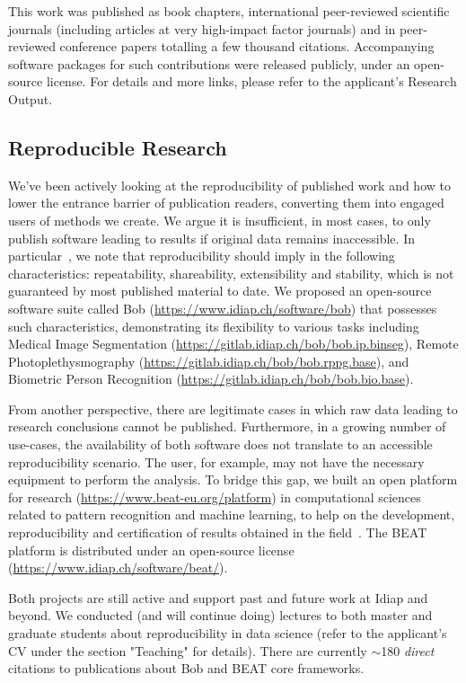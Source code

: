\documentclass[11pt,a4paper,sans]{moderncv}
\begin{document}
This work was published as book chapters, international peer-reviewed
scientific journals (including articles at very high-impact factor journals)
and in peer-reviewed conference papers totalling a few thousand citations.
Accompanying software packages for such contributions were released publicly,
under an open-source license. For details and more links, please refer to the
applicant's Research Output.

\subsection{Reproducible Research}

We've been actively looking at the reproducibility of published work and how to
lower the entrance barrier of publication readers, converting them into engaged
users of methods we create.  We argue it is insufficient, in most cases, to
only publish software leading to results if original data remains inaccessible.
In particular~\cite{acmmm-2012}, we note that reproducibility should imply
in the following characteristics: repeatability, shareability, extensibility
and stability, which is not guaranteed by most published material to date.  We
proposed an open-source software suite called Bob
(\url{https://www.idiap.ch/software/bob}) that possesses such characteristics,
demonstrating its flexibility to various tasks including Medical Image
Segmentation (\url{https://gitlab.idiap.ch/bob/bob.ip.binseg}), Remote
Photoplethysmography (\url{https://gitlab.idiap.ch/bob/bob.rppg.base}), and
Biometric Person Recognition (\url{https://gitlab.idiap.ch/bob/bob.bio.base}).

From another perspective, there are legitimate cases in which raw data leading
to research conclusions cannot be published.  Furthermore, in a growing number
of use-cases, the availability of both software does not translate to an
accessible reproducibility scenario.  The user, for example, may not have the
necessary equipment to perform the analysis.  To bridge this gap, we built an
open platform for research (\url{https://www.beat-eu.org/platform}) in
computational sciences related to pattern recognition and machine learning, to
help on the development, reproducibility and certification of results obtained
in the field~\cite{icml-2017-1}.  The BEAT platform is distributed under an
open-source license (\url{https://www.idiap.ch/software/beat/}).

Both projects are still active and support past and future work at Idiap and
beyond.  We conducted (and will continue doing) lectures to both master and
graduate students about reproducibility in data science (refer to the
applicant's CV under the section "Teaching" for details).  There are currently
$\sim$180 \textit{direct} citations to publications about Bob and BEAT core
frameworks.
\end{document}
